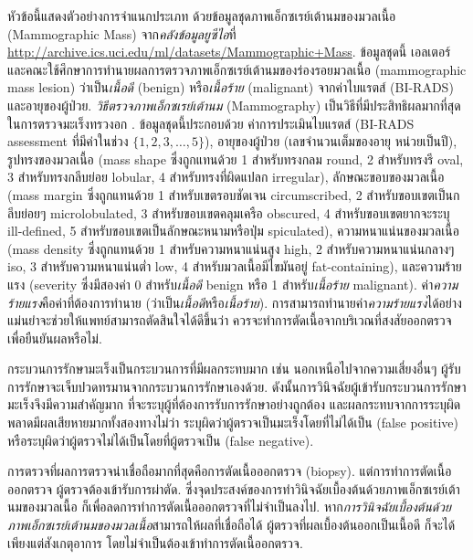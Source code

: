 หัวข้อนี้แสดงตัวอย่างการจำแนกประเภท ด้วยข้อมูลชุดภาพเอ็กซเรย์เต้านมของมวลเนื้อ (Mammographic Mass) 
จาก\textit{คลังข้อมูลยูซีไอ}ที่ \url{http://archive.ics.uci.edu/ml/datasets/Mammographic+Mass}.
ข้อมูลชุดนี้ 
เอลเตอร์และคณะ\cite{ElterEtAl2007a}ใช้ศึกษาการทำนายผลการตรวจภาพเอ็กซเรย์เต้านมของร่องรอยมวลเนื้อ (mammographic mass lesion) ว่าเป็น\textit{เนื้อดี} (benign) หรือ\textit{เนื้อร้าย} (malignant) จากค่าไบแรตส์ (BI-RADS) และอายุของผู้ป่วย.
\textit{วิธีตรวจภาพเอ็กซเรย์เต้านม} (Mammography) เป็นวิธีที่มีประสิทธิผลมากที่สุดในการตรวจมะเร็งทรวงอก \cite{ElterEtAl2007a}.
ข้อมูลชุดนี้ประกอบด้วย ค่าการประเมินไบแรตส์ (BI-RADS assessment ที่มีค่าในช่วง $\{1, 2, 3, \ldots, 5 \}$), 
อายุของผู้ป่วย (เลขจำนวนเต็มของอายุ หน่วยเป็นปี), 
รูปทรงของมวลเนื้อ (mass shape ซึ่งถูกแทนด้วย 
1 สำหรับทรงกลม round, 
2 สำหรับทรงรี oval, 
3 สำหรับทรงกลีบย่อย lobular, 
4 สำหรับทรงที่ผิดแปลก irregular), 
ลักษณะขอบของมวลเนื้อ (mass margin ซึ่งถูกแทนด้วย
1 สำหรับเขตรอบชัดเจน circumscribed, 
2 สำหรับขอบเขตเป็นกลีบย่อยๆ microlobulated, 
3 สำหรับขอบเขตคลุมเครือ obscured, 
4 สำหรับขอบเขตยากจะระบุ ill-defined, 
5 สำหรับขอบเขตเป็นลักษณะหนามหรือปุ่ม spiculated),
ความหนาแน่นของมวลเนื้อ (mass density ซึ่งถูกแทนด้วย
1 สำหรับความหนาแน่นสูง high, 
2 สำหรับความหนาแน่นกลางๆ iso, 
3 สำหรับความหนาแน่นต่ำ low, 
4 สำหรับมวลเนื้อมีไขมันอยู่ fat-containing),
และความร้ายแรง (severity ซึ่งมีสองค่า
0 สำหรับ\textit{เนื้อดี} benign
หรือ 1 สำหรับ\textit{เนื้อร้าย} malignant).
ค่า\textit{ความร้ายแรง}คือค่าที่ต้องการทำนาย (ว่าเป็น\textit{เนื้อดี}หรือ\textit{เนื้อร้าย}).
การสามารถทำนายค่า\textit{ความร้ายแรง}ได้อย่างแม่นยำจะช่วยให้แพทย์สามารถตัดสินใจได้ดีขึ้นว่า 
ควรจะทำการตัดเนื้อจากบริเวณที่สงสัยออกตรวจเพื่อยืนยันผลหรือไม่.

{\small
\begin{shaded}
กระบวนการรักษามะเร็งเป็นกระบวนการที่มีผลกระทบมาก เช่น 
นอกเหนือไปจากความเสี่ยงอื่นๆ
ผู้รับการรักษาจะเจ็บปวดทรมานจากกระบวนการรักษาเองด้วย.
ดังนั้นการวินิจฉัยผู้เข้ารับกระบวนการรักษามะเร็งจึงมีความสำคัญมาก
ที่จะระบุผู้ที่ต้องการรับการรักษาอย่างถูกต้อง
และผลกระทบจากการระบุผิดพลาดมีผลเสียหายมากทั้งสองทางไม่ว่า
ระบุผิดว่าผู้ตรวจเป็นมะเร็งโดยที่ไม่ได้เป็น (false positive)
หรือระบุผิดว่าผู้ตรวจไม่ได้เป็นโดยที่ผู้ตรวจเป็น (false negative).

การตรวจที่ผลการตรวจน่าเชื่อถือมากที่สุดคือการตัดเนื้อออกตรวจ (biopsy).
แต่การทำการตัดเนื้อออกตรวจ ผู้ตรวจต้องเข้ารับการผ่าตัด.
ซึ่งจุดประสงค์ของการทำวินิจฉัยเบื้องต้นด้วยภาพเอ็กซเรย์เต้านมของมวลเนื้อ
ก็เพื่อลดการทำการตัดเนื้อออกตรวจที่ไม่จำเป็นลงไป.
หาก\textit{การวินิจฉัยเบื้องต้นด้วยภาพเอ็กซเรย์เต้านมของมวลเนื้อ}สามารถให้ผลที่เชื่อถือได้
ผู้ตรวจที่ผลเบื้องต้นออกเป็นเนื้อดี ก็จะได้เพียงแต่สังเกตุอาการ โดยไม่จำเป็นต้องเข้าทำการตัดเนื้ออกตรวจ.
\end{shaded}
}%

